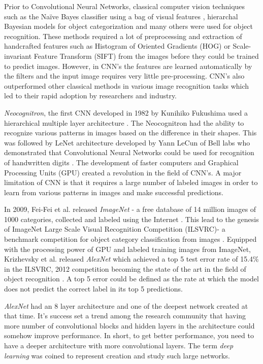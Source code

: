 Prior to Convolutional Neural Networks, classical computer vision techniques such as the Naïve Bayes classifier using a bag of visual features \cite{Csurka2004}, hierarchal Bayesian models for object categorization \cite{SivicREZF05} and many others were used for object recognition. These methods required a lot of preprocessing and extraction of handcrafted features such as Histogram of Oriented Gradients (HOG) or Scale-invariant Feature Transform (SIFT) from the images before they could be trained to predict images. However, in CNN's the features are learned automatically by the filters and the input image requires very little pre-processing. CNN's also outperformed other classical methods in various image recognition tasks which led to their rapid adoption by researchers and industry. 

\textit{Neocognitron}, the first CNN developed in 1982 by  Kunihiko Fukushima used a hierarchical multiple layer architecture \cite{FukushimaM82}.  The Neocognitron had the ability to recognize various patterns in images based on the difference in their shapes. This was followed by LeNet architecture developed by Yann LeCun of Bell labs who demonstrated that Convolutional Neural Networks could be used for recognition of handwritten digits \cite{LeNet1989}. The development of faster computers and Graphical Processing Units (GPU) created a revolution in the field of CNN's.  A major limitation of CNN is that it requires a large number of labeled images in order to learn from various patterns in images and make successful predictions. 

In 2009, Fei-Fei et al. released \textit{ImageNet} - a free database of 14 million images of 1000 categories, collected and labeled using the Internet \cite{ImageNet2009}. This lead to the genesis of ImageNet Large Scale Visual Recognition Competition (ILSVRC)-  a benchmark competition for object category classification from images \cite{ImageNETChallenge}. Equipped with the processing power of GPU and labeled training images from ImageNet, Krizhevsky et al. released \textit{AlexNet} which achieved a top 5 test error rate of 15.4\% in the ILSVRC, 2012 competition becoming the state of the art in the field of object recognition \cite{Alexnet2012}. A top 5 error could be defined as the rate at which the model does not predict the correct label in its top 5 predictions. 

\textit{AlexNet}  had an 8 layer architecture and one of the deepest network created at that time. It's success set a trend among the research community that having more number of convolutional blocks and hidden layers in the architecture could somehow improve performance. In short, to get better performance, you need to have a deeper architecture with more convolutional layers. The term \textit{deep learning} was coined to represent creation and study such large networks.

